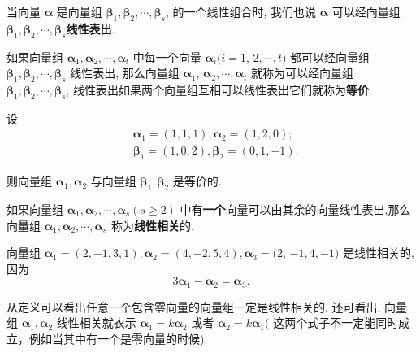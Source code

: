 \begin{definition}[线性表出]
    当向量 $\boldsymbol{\alpha}$ 是向量组 $\boldsymbol{\beta}_1, \boldsymbol{\beta}_2, \cdots, \boldsymbol{\beta}_s$, 的一个线性组合时, 我们也说 $\boldsymbol{\alpha}$ 可以经向量组 $\boldsymbol{\beta}_1, \boldsymbol{\beta}_2, \cdots, \boldsymbol{\beta}_s$\textcolor{third}{\bf 线性表出}.
\end{definition}

\begin{definition}[向量组等价]
    如果向量组 $\boldsymbol{\alpha}_1, \boldsymbol{\alpha}_2, \cdots, \boldsymbol{\alpha}_t$ 中每一个向量 $\boldsymbol{\alpha}_i(i=1$, $2, \cdots, t)$ 都可以经向量组 $\boldsymbol{\beta}_1, \boldsymbol{\beta}_2, \cdots, \boldsymbol{\beta}_s$ 线性表出, 那么向量组 $\boldsymbol{\alpha}_1$, $\boldsymbol{\alpha}_2, \cdots, \boldsymbol{\alpha}_t$ 就称为可以经向量组 $\boldsymbol{\beta}_1, \boldsymbol{\beta}_2, \cdots, \boldsymbol{\beta}_s$, 线性表出如果两个向量组互相可以线性表出它们就称为\textcolor{third}{\bf 等价}.
\end{definition}

\begin{exercise}
设
$$
\begin{aligned}
& \boldsymbol{\alpha}_1=(1,1,1), \boldsymbol{\alpha}_2=(1,2,0) ; \\
& \boldsymbol{\beta}_1=(1,0,2), \boldsymbol{\beta}_2=(0,1,-1) .
\end{aligned}
$$

则向量组 $\boldsymbol{\alpha}_1, \boldsymbol{\alpha}_2$ 与向量组 $\boldsymbol{\beta}_1, \boldsymbol{\beta}_2$ 是等价的.
\end{exercise}

\begin{definition}[向量组的线性相关]
如果向量组 $\boldsymbol{\alpha}_1, \boldsymbol{\alpha}_2, \cdots, \boldsymbol{\alpha}_s(s \geqslant 2)$ 中有\textbf{一个}向量可以由其余的向量线性表出,那么向量组 $\boldsymbol{\alpha}_1, \boldsymbol{\alpha}_2, \cdots, \boldsymbol{\alpha}_s$ 称为\textcolor{third}{\bf 线性相关}的.
\end{definition}

\begin{exercise}
向量组 $\boldsymbol{\alpha}_1=(2,-1,3,1), \boldsymbol{\alpha}_2=(4,-2,5,4), \boldsymbol{\alpha}_3=(2$, $-1,4,-1)$ 是线性相关的, 因为
$$
3 \boldsymbol{\alpha}_1-\boldsymbol{\alpha}_2=\boldsymbol{\alpha}_3 .
$$
\end{exercise}

从定义可以看出任意一个包含零向量的向量组一定是线性相关的. 还可看出, 向量组 $\boldsymbol{\alpha}_1, \boldsymbol{\alpha}_2$ 线性相关就衣示 $\boldsymbol{\alpha}_1=k \boldsymbol{\alpha}_2$ 或者 $\boldsymbol{\alpha}_2=k \boldsymbol{\alpha}_1($ 这两个式子不一定能同时成立，例如当其中有一个是零向量的时候).

